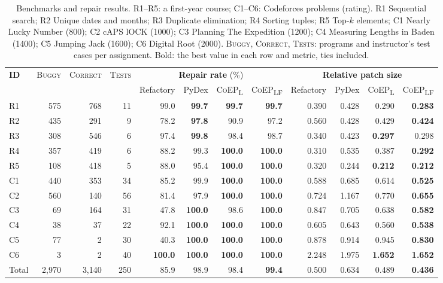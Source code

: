 \documentclass[acmsmall,screen,review,anonymous,nonacm]{acmart}
\newcommand{\coepL}{\textsc{CoEP}\textsubscript{L}\xspace}
\newcommand{\coepLF}{\textsc{CoEP}\textsubscript{LF}\xspace}
\begin{document}
\begin{table}[t]
\caption{Benchmarks and repair results. R1--R5: a first-year course; C1--C6: Codeforces problems (rating). R1 Sequential search; R2 Unique dates and months; R3 Duplicate elimination; R4 Sorting tuples; R5 Top-$k$ elements; C1 Nearly Lucky Number (800); C2 cAPS lOCK (1000); C3 Planning The Expedition (1200); C4 Measuring Lengths in Baden (1400); C5 Jumping Jack (1600); C6 Digital Root (2000). \textsc{Buggy}, \textsc{Correct}, \textsc{Tests}: programs and instructor's test cases per assignment. Bold: the best value in each row and metric, ties included.}
\label{tab:effect}
\centering
\footnotesize
\setlength{\tabcolsep}{4pt}
\begin{tabular}{l|rrr||rrrr||rrrr}
\toprule
\multirow{2}{*}{\textbf{ID}} & \multirow{2}{*}{\textsc{Buggy}} & \multirow{2}{*}{\textsc{Correct}} & \multirow{2}{*}{\textsc{Tests}} & \multicolumn{4}{c||}{\textbf{Repair rate} (\%)} & \multicolumn{4}{c}{\textbf{Relative patch size}} \\
\cline{5-12}
 & & & & Refactory & PyDex & \coepL & \coepLF & Refactory & PyDex & \coepL & \coepLF \\
\midrule\midrule
R1 & 575 & 768 & 11 & 99.0 & \textbf{99.7} & \textbf{99.7} & \textbf{99.7} & 0.390 & 0.428 & 0.290 & \textbf{0.283} \\
R2 & 435 & 291 & 9 & 78.2 & \textbf{97.8} & 90.9 & 97.2 & 0.560 & 0.428 & 0.429 & \textbf{0.424} \\
R3 & 308 & 546 & 6 & 97.4 & \textbf{99.8} & 98.4 & 98.7 & 0.340 & 0.423 & \textbf{0.297} & 0.298 \\
R4 & 357 & 419 & 6 & 88.2 & 99.3 & \textbf{100.0} & \textbf{100.0} & 0.310 & 0.535 & 0.387 & \textbf{0.292} \\
R5 & 108 & 418 & 5 & 88.0 & 95.4 & \textbf{100.0} & \textbf{100.0} & 0.320 & 0.244 & \textbf{0.212} & \textbf{0.212} \\
\midrule
C1 & 440 & 353 & 34 & 85.2 & 99.9 & \textbf{100.0} & \textbf{100.0} & 0.588 & 0.685 & 0.614 & \textbf{0.525} \\
C2 & 560 & 140 & 56 & 81.4 & 97.9 & \textbf{100.0} & \textbf{100.0} & 0.724 & 1.167 & 0.770 & \textbf{0.655} \\
C3 & 69 & 164 & 31 & 47.8 & \textbf{100.0} & 98.6 & \textbf{100.0} & 0.847 & 0.705 & 0.638 & \textbf{0.582} \\
C4 & 38 & 37 & 22 & 92.1 & \textbf{100.0} & \textbf{100.0} & \textbf{100.0} & 0.605 & 0.643 & 0.560 & \textbf{0.538} \\
C5 & 77 & 2 & 30 & 40.3 & \textbf{100.0} & \textbf{100.0} & \textbf{100.0} & 0.878 & 0.914 & 0.945 & \textbf{0.830} \\
C6 & 3 & 2 & 40 & \textbf{100.0} & \textbf{100.0} & \textbf{100.0} & \textbf{100.0} & 2.248 & 1.975 & \textbf{1.652} & \textbf{1.652} \\
\midrule
Total & 2,970 & 3,140 & 250 & 85.9 & 98.9 & 98.4 & \textbf{99.4} & 0.500 & 0.634 & 0.489 & \textbf{0.436} \\
\bottomrule
\end{tabular}
\end{table}
\end{document}
